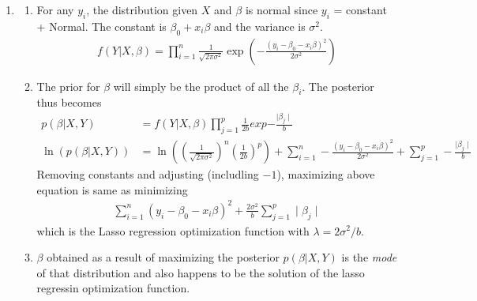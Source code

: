 \documentclass[11pt, a4paper]{article}
\begin{document}
\begin{enumerate}
        \item
        \begin{enumerate}
            \item For any $y_{i}$, the distribution given $X$ and $\beta$ is normal since $y_{i}$ = constant + Normal. The constant is $\beta_{0} + x_{i}\beta$ and the variance is $\sigma^{2}$.
            \begin{align*}
                f(Y|X,\beta) = \prod_{i=1}^{n} \frac{1}{\sqrt{2\pi \sigma^{2}}}\exp(-\frac{(y_{i}-\beta_{0}-x_{i}\beta)^{2}}{2\sigma^{2}})
            \end{align*}
            \item The prior for $\beta$ will simply be the product of all the $\beta_{i}$. The posterior thus becomes
            \begin{align*}
                p(\beta|X,Y) &= f(Y|X,\beta)\prod_{j=1}^{p}\frac{1}{2b}exp{-\frac{\mid \beta_{j} \mid}{b}}\\
                \ln(p(\beta|X,Y)) &= \ln((\frac{1}{\sqrt{2\pi \sigma^{2}}})^{n} (\frac{1}{2b})^{p}) + \sum_{i=1}^{n} -\frac{(y_{i}-\beta_{0}-x_{i}\beta)^{2}}{2\sigma^{2}} + \sum_{j=1}^{p} -\frac{\mid \beta_{j} \mid}{b}
            \end{align*}
            Removing constants and adjusting (includling $-1$), maximizing above equation is same as minimizing
            \begin{align*}
                \sum_{i=1}^{n} (y_{i}-\beta_{0}-x_{i}\beta)^{2} + \frac{2\sigma^{2}}{b}\sum_{j=1}^{p} \mid \beta_{j} \mid
            \end{align*}
            which is the Lasso regression optimization function with $\lambda = 2\sigma^{2}/b$.

            \item $\beta$ obtained as a result of maximizing the posterior $p(\beta|X,Y)$ is the \emph{mode} of that distribution and also happens to be the solution of the lasso regressin optimization function.


\end{enumerate}
\end{enumerate}
\end{document}
